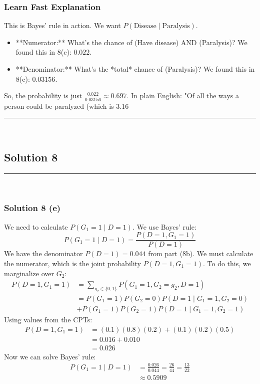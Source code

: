 \documentclass{article}
\begin{document}
{{\subsubsection*{Learn Fast Explanation}
This is Bayes' rule in action. We want $P(\text{Disease} \mid \text{Paralysis})$.
\begin{itemize}
    \item **Numerator:** What's the chance of (Have disease) AND (Paralysis)? We found this in 8(c): $0.022$.
    \item **Denominator:** What's the *total* chance of (Paralysis)? We found this in 8(c): $0.03156$.
\end{itemize}
So, the probability is just $\frac{0.022}{0.03156} \approx 0.697$.
In plain English: "Of all the ways a person could be paralyzed (which is 3.16%

\noindent\rule{\textwidth}{0.4pt}\\

\newpage

\subsection*{Solution 8}
\noindent\rule{\textwidth}{0.4pt}\\
\subsubsection*{Solution 8 (e)}
We need to calculate $P(G_1=1 \mid D=1)$. We use Bayes' rule:
$$ P(G_1=1 \mid D=1) = \frac{P(D=1, G_1=1)}{P(D=1)} $$
We have the denominator $P(D=1) = 0.044$ from part (8b).
We must calculate the numerator, which is the joint probability $P(D=1, G_1=1)$. To do this, we marginalize over $G_2$:
\begin{align*}
    P(D=1, G_1=1) &= \sum_{g_2 \in \{0,1\}} P(G_1=1, G_2=g_2, D=1) \\
                 &= P(G_1=1)P(G_2=0)P(D=1 \mid G_1=1, G_2=0) \\
                 &+ P(G_1=1)P(G_2=1)P(D=1 \mid G_1=1, G_2=1)
\end{align*}
Using values from the CPTs:
\begin{align*}
    P(D=1, G_1=1) &= (0.1)(0.8)(0.2) + (0.1)(0.2)(0.5) \\
                 &= 0.016 + 0.010 \\
                 &= 0.026
\end{align*}
Now we can solve Bayes' rule:
\begin{align*}
    P(G_1=1 \mid D=1) &= \frac{0.026}{0.044} = \frac{26}{44} = \frac{13}{22} \\
                   &\approx 0.5909
\end{align*}

}}
\end{document}
